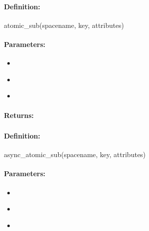 \paragraph{Definition:}
\begin{rubycode}
atomic_sub(spacename, key, attributes)
\end{rubycode}

\paragraph{Parameters:}
\begin{itemize}[noitemsep]
\item {}\\

\item {}\\

\item {}\\

\end{itemize}

\paragraph{Returns:}


\pagebreak
\subsubsection{}
\label{api:ruby:async_atomic_sub}


\paragraph{Definition:}
\begin{rubycode}
async_atomic_sub(spacename, key, attributes)
\end{rubycode}

\paragraph{Parameters:}
\begin{itemize}[noitemsep]
\item {}\\

\item {}\\

\item {}\\

\end{itemize}

